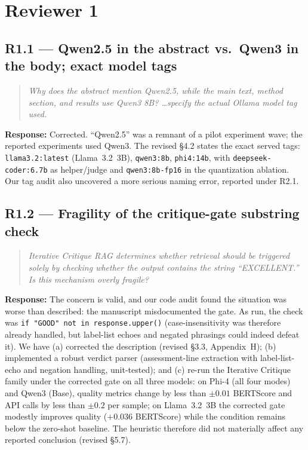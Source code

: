 \documentclass[11pt]{article}
\newcommand{\rcomment}[1]{\begin{quote}\itshape\color{black!70}#1\end{quote}}
\newcommand{\resp}{\noindent\textbf{Response:} }
\begin{document}
\section{Reviewer 1}

\subsection*{R1.1 --- Qwen2.5 in the abstract vs.\ Qwen3 in the body; exact model tags}
\rcomment{Why does the abstract mention Qwen2.5, while the main text, method section, and results use Qwen3 8B? \dots specify the actual Ollama model tag used.}
\resp Corrected. ``Qwen2.5'' was a remnant of a pilot experiment wave; the reported experiments used Qwen3. The revised \S4.2 states the exact served tags: \texttt{llama3.2:latest} (Llama~3.2~3B), \texttt{qwen3:8b}, \texttt{phi4:14b}, with \texttt{deepseek-coder:6.7b} as helper/judge and \texttt{qwen3:8b-fp16} in the quantization ablation. Our tag audit also uncovered a more serious naming error, reported under R2.1.

\subsection*{R1.2 --- Fragility of the critique-gate substring check}
\rcomment{Iterative Critique RAG determines whether retrieval should be triggered solely by checking whether the output contains the string ``EXCELLENT.'' Is this mechanism overly fragile?}
\resp The concern is valid, and our code audit found the situation was worse than described: the manuscript misdocumented the gate. As run, the check was \texttt{if "GOOD" not in response.upper()} (case-insensitivity was therefore already handled, but label-list echoes and negated phrasings could indeed defeat it). We have (a) corrected the description (revised \S3.3, Appendix~H); (b) implemented a robust verdict parser (assessment-line extraction with label-list-echo and negation handling, unit-tested); and (c) re-run the Iterative Critique family under the corrected gate on all three models: on Phi-4 (all four modes) and Qwen3 (Base), quality metrics change by less than $\pm0.01$ BERTScore and API calls by less than $\pm0.2$ per sample; on Llama~3.2~3B the corrected gate modestly improves quality ($+0.036$ BERTScore) while the condition remains below the zero-shot baseline. The heuristic therefore did not materially affect any reported conclusion (revised \S5.7).
\end{document}
